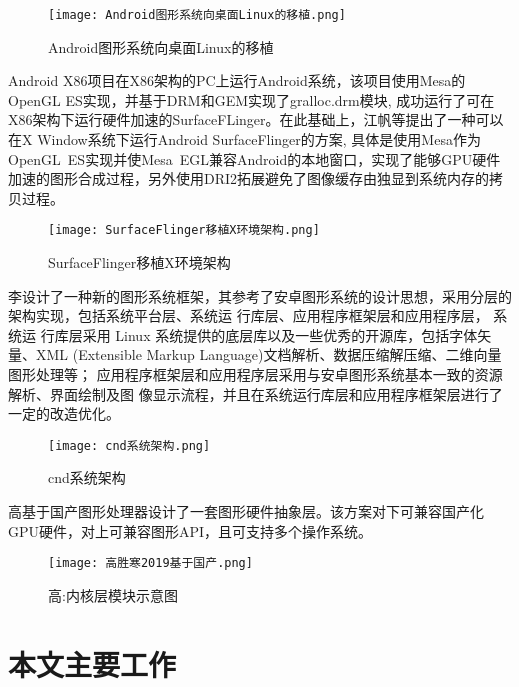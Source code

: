 \begin{figure}[h]
  \centering
  \texttt{[image: Android图形系统向桌面Linux的移植.png]}
  \caption{Android图形系统向桌面Linux的移植}\cite{张超2012Android}
\end{figure}

Android X86\cite{AndroidX86}项目在X86架构的PC上运行Android系统，该项目使用Mesa\cite{mesa3d}的OpenGL ES实现，并基于DRM\cite{DRM}和GEM\cite{GEM}实现了gralloc.drm模块,
成功运行了可在X86架构下运行硬件加速的SurfaceFLinger。在此基础上，江帆等\cite{XTYY201710015}提出了一种可以在X Window系统下运行Android SurfaceFlinger的方案,
具体是使用Mesa作为OpenGL ES实现并使Mesa EGL兼容Android的本地窗口，实现了能够GPU硬件加速的图形合成过程，另外使用DRI2拓展避免了图像缓存由独显到系统内存的拷贝过程。

\begin{figure}[H]
  \centering
  \texttt{[image: SurfaceFlinger移植X环境架构.png]}
  \caption{SurfaceFlinger移植X环境架构}\cite{XTYY201710015}
\end{figure}

李\cite{1016779798.nh}设计了一种新的图形系统框架，其参考了安卓图形系统的设计思想，采用分层的架构实现，包括系统平台层、系统运 行库层、应用程序框架层和应用程序层，
系统运 行库层采用 Linux 系统提供的底层库以及一些优秀的开源库，包括字体矢量、XML (Extensible Markup Language)文档解析、数据压缩解压缩、二维向量图形处理等；
应用程序框架层和应用程序层采用与安卓图形系统基本一致的资源解析、界面绘制及图 像显示流程，并且在系统运行库层和应用程序框架层进行了一定的改造优化。
\begin{figure}[H]
  \centering
  \texttt{[image: cnd系统架构.png]}
  \caption{cnd系统架构}\cite{1016779798.nh}
\end{figure}

高\cite{高胜寒2019基于国产}基于国产图形处理器设计了一套图形硬件抽象层。该方案对下可兼容国产化GPU硬件，对上可兼容图形API，且可支持多个操作系统。
\begin{figure}[H]
  \centering
  \texttt{[image: 高胜寒2019基于国产.png]}
  \caption{高:内核层模块示意图}\cite{高胜寒2019基于国产}
\end{figure}

\section{本文主要工作}

